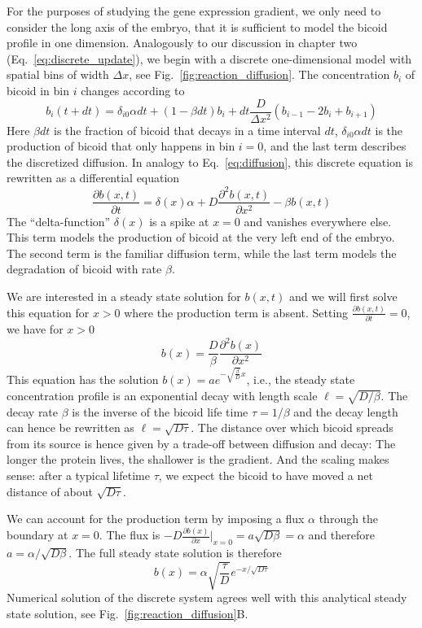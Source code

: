 For the purposes of studying the gene expression gradient, we only need to consider the long axis of the embryo, that it is sufficient to model the bicoid profile in one dimension.
Analogously to our discussion in chapter two (Eq.~\ref{eq:discrete_update}), we begin with a discrete one-dimensional model with spatial bins of width $\Delta x$, see Fig.~\ref{fig:reaction_diffusion}.
The concentration $b_i$ of bicoid in bin $i$ changes according to
\begin{equation}
	b_i(t+dt) = \delta_{i0}\alpha dt + (1-\beta dt )b_i + dt\frac{D}{\Delta x^2} (b_{i-1} - 2b_i + b_{i+1})
\end{equation}
Here $\beta dt$ is the fraction of bicoid that decays in a time interval $dt$, $\delta_{i0}\alpha dt$ is the production of bicoid that only happens in bin $i=0$, and the last term describes the discretized diffusion.
In analogy to Eq.~\ref{eq:diffusion}, this discrete equation is rewritten as a differential equation
\begin{equation}
	\frac{\partial b(x,t)}{\partial t} = \delta(x)\alpha + D\frac{\partial^2 b(x,t)}{\partial x^2} - \beta b(x,t)
\end{equation}
The ``delta-function'' $\delta(x)$ is a spike at $x=0$ and vanishes everywhere else.
This term models the production of bicoid at the very left end of the embryo.
The second term is the familiar diffusion term, while the last term models the degradation of bicoid with rate $\beta$.

We are interested in a steady state solution for $b(x,t)$ and we will first solve this equation for $x>0$ where the production term is absent.
Setting $\frac{\partial b(x,t)}{\partial t}=0$, we have for $x>0$
\begin{equation}
b(x) = \frac{D}{\beta}\frac{\partial^2 b(x)}{\partial x^2}
\end{equation}
This equation has the solution $b(x) = a e^{-\sqrt{\frac{\beta}{D}}x}$, i.e., the steady state concentration profile is an exponential decay with length scale $\ell = \sqrt{D/\beta}$.
The decay rate $\beta$ is the inverse of the bicoid life time $\tau = 1/\beta$ and the decay length can hence be rewritten as $\ell = \sqrt{D \tau}$.
The distance over which bicoid spreads from its source is hence given by a trade-off between diffusion and decay: The longer the protein lives, the shallower is the gradient.
And the scaling makes sense: after a typical lifetime $\tau$, we expect the bicoid to have moved a net distance of about $\sqrt{D\tau}$.

We can account for the production term by imposing a flux $\alpha$ through the boundary at $x=0$.
The flux is $-D\frac{\partial b(x)}{\partial x}|_{x=0}=a \sqrt{D\beta}=\alpha$ and therefore $a = \alpha/\sqrt{D\beta}$.
The full steady state solution is therefore
\begin{equation}
 	b(x) = \alpha \sqrt{\frac{\tau}{D}} e^{-x/\sqrt{D\tau}}
\end{equation}
Numerical solution of the discrete system agrees well with this analytical steady state solution, see Fig.~\ref{fig:reaction_diffusion}B.

